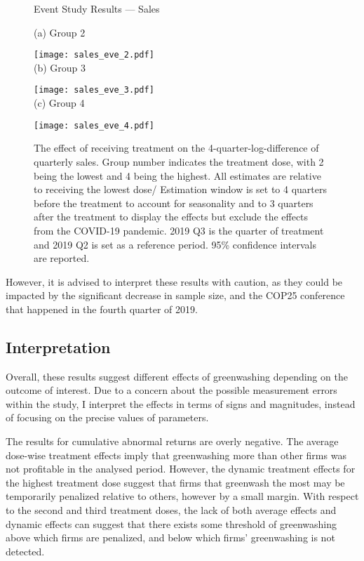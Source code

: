 \documentclass[12pt]{article}
\begin{document}
\begin{figure}
    \caption{Event Study Results --- Sales}
    \centering
    
    (a) Group 2
    
    \texttt{[image: sales\_eve\_2.pdf]} \\
    
    (b) Group 3
    
    \texttt{[image: sales\_eve\_3.pdf]} \\
    
    (c) Group 4
    
    \texttt{[image: sales\_eve\_4.pdf]}
    
    \captionsetup{font=footnotesize}
    \caption*{The effect of receiving treatment on the 4-quarter-log-difference of quarterly sales. Group number indicates the treatment dose, with 2 being the lowest and 4 being the highest. All estimates are relative to receiving the lowest dose/ Estimation window is set to 4 quarters before the treatment to account for seasonality and to 3 quarters after the treatment to display the effects but exclude the effects from the COVID-19 pandemic. 2019 Q3 is the quarter of treatment and 2019 Q2 is set as a reference period. 95\% confidence intervals are reported.}
\end{figure}

However, it is advised to interpret these results with caution, as they could be impacted by the significant decrease in sample size, and the COP25 conference that happened in the fourth quarter of 2019. 



\subsection{Interpretation}

Overall, these results suggest different effects of greenwashing depending on the outcome of interest. Due to a concern about the possible measurement errors within the study, I interpret the effects in terms of signs and magnitudes, instead of focusing on the precise values of parameters.

The results for cumulative abnormal returns are overly negative. The average dose-wise treatment effects imply that greenwashing more than other firms was not profitable in the analysed period. However, the dynamic treatment effects for the highest treatment dose suggest that firms that greenwash the most may be temporarily penalized relative to others, however by a small margin. With respect to the second and third treatment doses, the lack of both average effects and dynamic effects can suggest that there exists some threshold of greenwashing above which firms are penalized, and below which firms' greenwashing is not detected.
\end{document}

